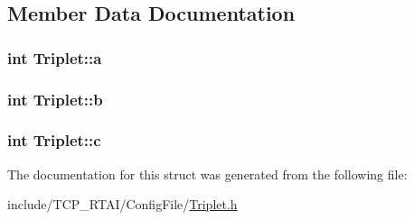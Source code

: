 \subsection{Member Data Documentation}
\hypertarget{structTriplet_a8f29696c8699a74d729762bd4ac021e0}{
\subsubsection[{a}]{\setlength{\rightskip}{0pt plus 5cm}int {\bf Triplet::a}}}
\label{structTriplet_a8f29696c8699a74d729762bd4ac021e0}
\hypertarget{structTriplet_ab04c763889df0502639bc2020f445057}{
\subsubsection[{b}]{\setlength{\rightskip}{0pt plus 5cm}int {\bf Triplet::b}}}
\label{structTriplet_ab04c763889df0502639bc2020f445057}
\hypertarget{structTriplet_a55aeb5803c35b59e170160588c090dbb}{
\subsubsection[{c}]{\setlength{\rightskip}{0pt plus 5cm}int {\bf Triplet::c}}}
\label{structTriplet_a55aeb5803c35b59e170160588c090dbb}


The documentation for this struct was generated from the following file:\begin{DoxyCompactItemize}
\item 
include/TCP\_\-RTAI/ConfigFile/\hyperlink{Triplet_8h}{Triplet.h}\end{DoxyCompactItemize}
